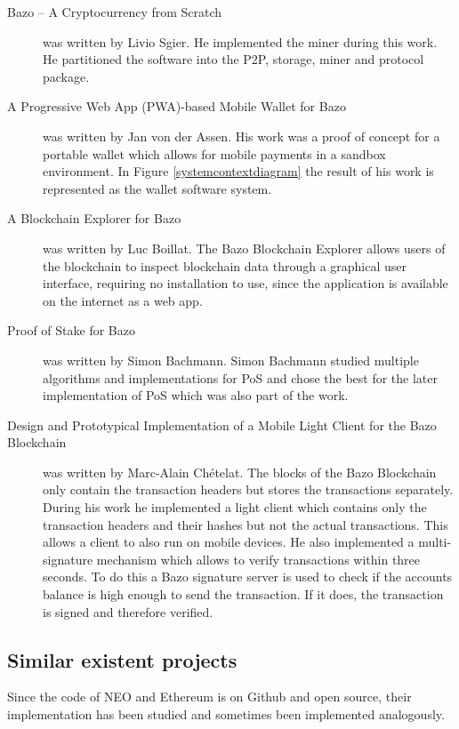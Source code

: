 \begin{description}
	\item [Bazo – A Cryptocurrency from Scratch \cite{ba_miner}] was written by Livio Sgier. He implemented the miner during this work. He partitioned the software into the P2P, storage, miner and protocol package.
	\item [A Progressive Web App (PWA)-based Mobile Wallet for Bazo \cite{ba_wallet}] was written by Jan von der Assen. His work was a proof of concept for a portable wallet which allows for mobile payments in a sandbox environment. In Figure \ref{systemcontextdiagram} the result of his work is represented as the wallet software system.
	\item [A Blockchain Explorer for Bazo \cite{ba_explorer}] was written by Luc Boillat. The Bazo Blockchain Explorer allows users of the blockchain to inspect blockchain data through a graphical user interface, requiring no installation to use, since the application is available on the internet as a web app. \cite{ba_explorer}
	\item [Proof of Stake for Bazo \cite{ba_pos}] was written by Simon Bachmann. Simon Bachmann studied multiple algorithms and implementations for PoS and chose the best for the later implementation of PoS which was also part of the work.
	\item [Design and Prototypical Implementation of a Mobile Light Client for the Bazo Blockchain \cite{ba_client}] was written by Marc-Alain Chételat. The blocks of the Bazo Blockchain only contain the transaction headers but stores the transactions separately. During his work he implemented a light client which contains only the transaction headers and their hashes but not the actual transactions. This allows a client to also run on mobile devices. He also 	implemented a multi-signature mechanism which allows to verify transactions within three seconds.  To do this a Bazo signature server is used to check if the accounts balance is high enough to send the transaction. If it does, the transaction is signed and therefore verified. 
\end{description}

\subsection{Similar existent projects}
Since the code of NEO and Ethereum is on Github and open source, their implementation has been studied and sometimes been implemented analogously. 

